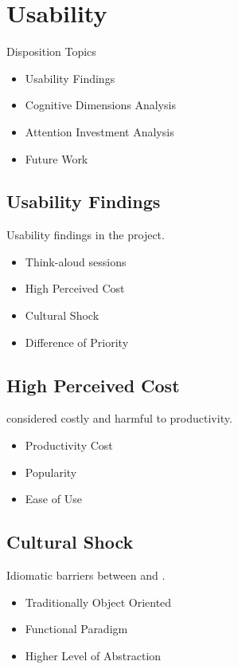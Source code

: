 \section{Usability}
\begin{frame}{\secname}{Disposition}
	Topics
	\begin{itemize}
		\item Usability Findings
		\item Cognitive Dimensions Analysis
		\item Attention Investment Analysis
		\item Future Work
	\end{itemize}
\end{frame}

\subsection{Usability Findings}
\begin{frame}{\secname}{\subsecname}
	Usability findings in the project.
	\begin{itemize}
		\item<2-> Think-aloud sessions
		\item<3-> High Perceived Cost
		\item<4-> Cultural Shock
		\item<5-> Difference of Priority
	\end{itemize}
\end{frame}

\subsection{High Perceived Cost}
\begin{frame}{\secname}{\subsecname}
	\fs considered costly and harmful to productivity.
	\begin{itemize}
		\item<2-> Productivity Cost
		\item<3-> Popularity
		\item<4-> Ease of Use
	\end{itemize}
\end{frame}

\subsection{Cultural Shock}
\begin{frame}{\secname}{\subsecname}
	Idiomatic barriers between \cs and \fs.
	\begin{itemize}
		\item<2-> Traditionally Object Oriented
		\item<3-> Functional Paradigm
		\item<4-> Higher Level of Abstraction
	\end{itemize}
\end{frame}


